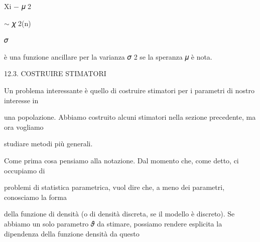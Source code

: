 \documentclass[a4paper,portrait,12pt]{article}
\begin{document}
\begin{flushleft}
Xi $-$ 𝜇 2
\end{flushleft}


\begin{flushleft}
$\sim$ 𝜒 2(n)
\end{flushleft}


\begin{flushleft}
𝜎
\end{flushleft}





\begin{flushleft}
\`{e} una funzione ancillare per la varianza 𝜎 2 se la speranza 𝜇 \`{e} nota.
\end{flushleft}





\begin{flushleft}
12.3. COSTRUIRE STIMATORI
\end{flushleft}


\begin{flushleft}
Un problema interessante \`{e} quello di costruire stimatori per i parametri di nostro interesse in
\end{flushleft}


\begin{flushleft}
una popolazione. Abbiamo costruito alcuni stimatori nella sezione precedente, ma ora vogliamo
\end{flushleft}


\begin{flushleft}
studiare metodi più generali.
\end{flushleft}


\begin{flushleft}
Come prima cosa pensiamo alla notazione. Dal momento che, come detto, ci occupiamo di
\end{flushleft}


\begin{flushleft}
problemi di statistica parametrica, vuol dire che, a meno dei parametri, conosciamo la forma
\end{flushleft}


\begin{flushleft}
della funzione di densit\`{a} (o di densit\`{a} discreta, se il modello \`{e} discreto). Se abbiamo un solo parametro 𝜗 da stimare, possiamo rendere esplicita la dipendenza della funzione densit\`{a} da questo
\end{flushleft}
\end{document}
